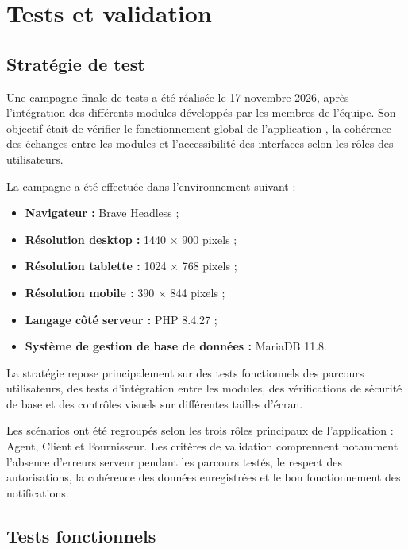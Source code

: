 
\chapter{Tests et validation}
\label{chap:tests}

\section{Stratégie de test}

Une campagne finale de tests a été réalisée le 17 novembre 2026, après l'intégration des différents modules développés par les membres de l'équipe. Son objectif était de vérifier le fonctionnement global de l'application \projectname{}, la cohérence des échanges entre les modules et l'accessibilité des interfaces selon les rôles des utilisateurs.

La campagne a été effectuée dans l'environnement suivant :

\begin{itemize}
    \item \textbf{Navigateur :} Brave Headless ;
    \item \textbf{Résolution desktop :} 1440 $\times$ 900 pixels ;
    \item \textbf{Résolution tablette :} 1024 $\times$ 768 pixels ;
    \item \textbf{Résolution mobile :} 390 $\times$ 844 pixels ;
    \item \textbf{Langage côté serveur :} PHP 8.4.27 ;
    \item \textbf{Système de gestion de base de données :} MariaDB 11.8.
\end{itemize}

La stratégie repose principalement sur des tests fonctionnels des parcours utilisateurs, des tests d'intégration entre les modules, des vérifications de sécurité de base et des contrôles visuels sur différentes tailles d'écran.

Les scénarios ont été regroupés selon les trois rôles principaux de l'application : Agent, Client et Fournisseur. Les critères de validation comprennent notamment l'absence d'erreurs serveur pendant les parcours testés, le respect des autorisations, la cohérence des données enregistrées et le bon fonctionnement des notifications.

\section{Tests fonctionnels}

